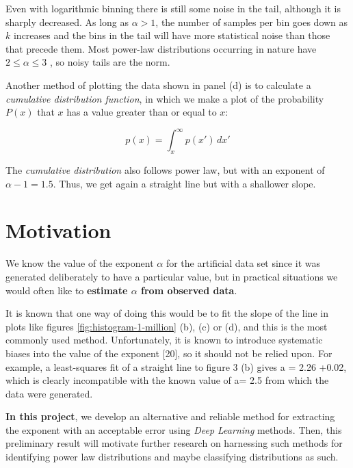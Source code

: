 \documentclass[a4paper, 12pt]{report}
\begin{document}
Even with logarithmic binning there is still some noise in the tail, although it is sharply decreased. As long as $\alpha > 1$, the number of samples per bin goes down as $k$ increases and the bins in the tail will have more statistical noise than those that precede them. Most power-law distributions occurring in nature have $2 \leq \alpha \leq 3$ \cite{newman}, so noisy tails are the norm.

Another method of plotting the data shown in panel (d) is to calculate a \textit{cumulative distribution function}, in which we make a plot of the probability $P(x)$ that $x$ has a value greater than or equal to $x$:

\begin{equation}
\label{eq:cumsum}
p(x) = \int_{x}^{\infty} p(x')\, dx'
\end{equation}

The \textit{cumulative distribution} also follows power law, but with an exponent of $\alpha-1 = 1.5$. Thus, we get again a straight line but with a shallower slope.

\section{Motivation}
We know the value of the exponent $\alpha$ for the artificial data set since it was generated deliberately to have a particular value, but in practical situations we would often like to \textbf{estimate $\alpha$ from observed data}.

It is known \cite{newman} that one way of doing this would be to fit the slope of the line in plots like figures \ref{fig:histogram-1-million} (b), (c) or (d), and this is the most commonly used method.
Unfortunately, it is known to introduce systematic biases into the value of the exponent [20], so it should not be relied upon. For example, a least-squares fit of a straight line to
figure 3 (b) gives a = 2.26 +0.02, which is clearly incompatible with the known value of a= 2.5 from which the data were generated.

\textbf{In this project}, we develop an alternative and reliable method for extracting the exponent with an acceptable error using \textit{Deep Learning} methods. Then, this preliminary result will motivate further research on harnessing such methods for identifying power law distributions and maybe classifying distributions as such.
\end{document}
